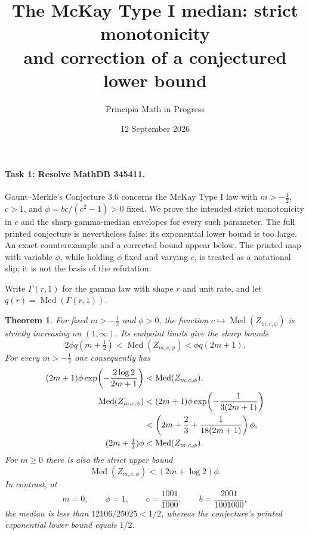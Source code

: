 \documentclass[11pt]{article}
\title{The McKay Type I median: strict monotonicity\\
and correction of a conjectured lower bound}
\author{Principia Math in Progress}
\date{12 September 2026}
\newtheorem{theorem}{Theorem}
\newcommand{\Med}{\operatorname{Med}}
\begin{document}
\maketitle

\paragraph{Task 1: Resolve MathDB 345411.}
Gaunt--Merkle's Conjecture 3.6 \cite{GM} concerns the McKay Type I law
with \(m>-\tfrac12\), \(c>1\), and
\(\phi=bc/(c^2-1)>0\) fixed. We prove the intended strict monotonicity
in \(c\) and the sharp gamma-median envelopes for every such parameter.
The full printed conjecture is nevertheless false: its exponential
lower bound is too large. An exact counterexample and a corrected
bound appear below. The printed map with variable \(\phi\), while
holding \(\phi\) fixed and varying \(c\), is treated as a notational
slip; it is not the basis of the refutation.

Write \(\Gamma(r,1)\) for the gamma law with shape \(r\) and unit rate,
and let \(q(r)=\Med(\Gamma(r,1))\).

\begin{theorem}\label{thm:main}
For fixed \(m>-\tfrac12\) and \(\phi>0\), the function
\(c\mapsto\Med(Z_{m,c,\phi})\) is strictly increasing on \((1,\infty)\).
Its endpoint limits give the sharp bounds
\begin{equation}\label{eq:envelopes}
 2\phi q(m+\tfrac12)<\Med(Z_{m,c,\phi})<\phi q(2m+1).
\end{equation}
For every \(m>-\tfrac12\) one consequently has
\begin{align}
 (2m+1)\phi\exp\!\left(-\frac{2\log2}{2m+1}\right)
 &<\Med(Z_{m,c,\phi}),                                      \label{eq:correct}\\
 \Med(Z_{m,c,\phi})
 &<(2m+1)\phi\exp\!\left(-\frac{1}{3(2m+1)}\right) \notag\\
 &<\left(2m+\frac23+\frac{1}{18(2m+1)}\right)\phi,             \label{eq:upper}\\
 (2m+\tfrac13)\phi&<\Med(Z_{m,c,\phi}).                       \label{eq:linear}
\end{align}
For \(m\geq0\) there is also the strict upper bound
\begin{equation}\label{eq:linearupper}
 \Med(Z_{m,c,\phi})<(2m+\log2)\phi.
\end{equation}
In contrast, at
\[
 m=0,\qquad \phi=1,\qquad c=\frac{1001}{1000},
 \qquad b=\frac{2001}{1001000},
\]
the median is less than \(12106/25025<1/2\), whereas the conjecture's
printed exponential lower bound equals \(1/2\).
\end{theorem}
\end{document}
